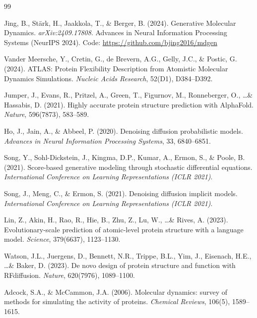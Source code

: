 \documentclass[11pt,a4paper]{article}
\begin{document}
\newpage
\begin{thebibliography}{99}

Jing, B., St\"{a}rk, H., Jaakkola, T., \& Berger, B. (2024).
Generative Molecular Dynamics.
\textit{arXiv:2409.17808}. Advances in Neural Information Processing Systems (NeurIPS 2024).
Code: \url{https://github.com/bjing2016/mdgen}

Vander Meersche, Y., Cretin, G., de Brevern, A.G., Gelly, J.C., \& Postic, G. (2024).
ATLAS: Protein Flexibility Description from Atomistic Molecular Dynamics Simulations.
\textit{Nucleic Acids Research}, 52(D1), D384--D392.

Jumper, J., Evans, R., Pritzel, A., Green, T., Figurnov, M., Ronneberger, O., \ldots \& Hassabis, D. (2021).
Highly accurate protein structure prediction with AlphaFold.
\textit{Nature}, 596(7873), 583--589.

Ho, J., Jain, A., \& Abbeel, P. (2020).
Denoising diffusion probabilistic models.
\textit{Advances in Neural Information Processing Systems}, 33, 6840--6851.

Song, Y., Sohl-Dickstein, J., Kingma, D.P., Kumar, A., Ermon, S., \& Poole, B. (2021).
Score-based generative modeling through stochastic differential equations.
\textit{International Conference on Learning Representations (ICLR 2021)}.

Song, J., Meng, C., \& Ermon, S. (2021).
Denoising diffusion implicit models.
\textit{International Conference on Learning Representations (ICLR 2021)}.

Lin, Z., Akin, H., Rao, R., Hie, B., Zhu, Z., Lu, W., \ldots \& Rives, A. (2023).
Evolutionary-scale prediction of atomic-level protein structure with a language model.
\textit{Science}, 379(6637), 1123--1130.

Watson, J.L., Juergens, D., Bennett, N.R., Trippe, B.L., Yim, J., Eisenach, H.E., \ldots \& Baker, D. (2023).
De novo design of protein structure and function with RFdiffusion.
\textit{Nature}, 620(7976), 1089--1100.

Adcock, S.A., \& McCammon, J.A. (2006).
Molecular dynamics: survey of methods for simulating the activity of proteins.
\textit{Chemical Reviews}, 106(5), 1589--1615.


\end{thebibliography}
\end{document}

